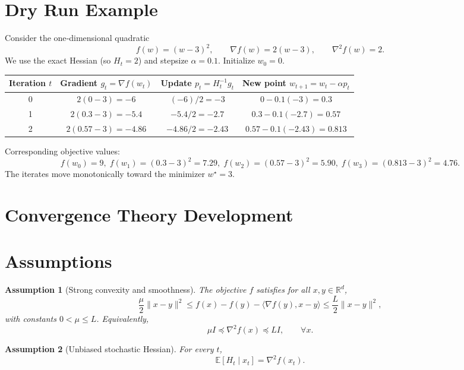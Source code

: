 \documentclass[11pt]{article}
\newtheorem{assumption}{Assumption}[section]
\begin{document}
\section{Dry Run Example}
Consider the one‑dimensional quadratic
\[
f(w)=(w-3)^{2},
\qquad \nabla f(w)=2(w-3),\qquad 
\nabla^{2}f(w)=2 .
\]
We use the exact Hessian (so $H_{t}=2$) and stepsize $\alpha=0.1$.
Initialize $w_{0}=0$.

\begin{center}
\begin{tabular}{c|c|c|c}
Iteration $t$ & Gradient $g_{t}= \nabla f(w_{t})$ & Update $p_{t}=H_{t}^{-1}g_{t}$ & New point $w_{t+1}=w_{t}-\alpha p_{t}$ \\ \midrule
0 & $2(0-3)=-6$ & $(-6)/2=-3$ & $0-0.1(-3)=0.3$ \\ 
1 & $2(0.3-3)=-5.4$ & $-5.4/2=-2.7$ & $0.3-0.1(-2.7)=0.57$ \\ 
2 & $2(0.57-3)=-4.86$ & $-4.86/2=-2.43$ & $0.57-0.1(-2.43)=0.813$ \\ 
\end{tabular}
\end{center}
Corresponding objective values:
\[
f(w_{0})=9,\; f(w_{1})=(0.3-3)^{2}=7.29,\; f(w_{2})=(0.57-3)^{2}=5.90,\; f(w_{3})=(0.813-3)^{2}=4.76.
\]
The iterates move monotonically toward the minimizer $w^{\star}=3$.

\section*{Convergence Theory Development}

\section{Assumptions}
\begin{assumption}[Strong convexity and smoothness]\label{as:strong-smooth}
The objective $f$ satisfies for all $x,y\in\mathbb{R}^{d}$,
\[
\frac{\mu}{2}\|x-y\|^{2}\le f(x)-f(y)-\langle\nabla f(y),x-y\rangle\le 
\frac{L}{2}\|x-y\|^{2},
\]
with constants $0<\mu\le L$.  Equivalently,
\[
\mu I \preceq \nabla^{2}f(x)\preceq L I,\qquad\forall x.
\]
\end{assumption}

\begin{assumption}[Unbiased stochastic Hessian]\label{as:hessian-unbiased}
For every $t$,
\[
\mathbb{E}\!\left[H_{t}\mid x_{t}\right]=\nabla^{2}f(x_{t}).
\]
\end{assumption}
\end{document}
